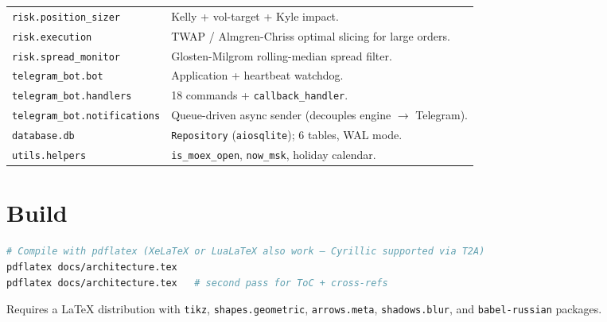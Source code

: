 \documentclass[11pt,a4paper]{article}
\begin{document}
\begin{center}
\begin{tabular}{@{}lp{11cm}@{}}
\texttt{risk.position\_sizer} & Kelly + vol-target + Kyle impact. \\
\texttt{risk.execution} & TWAP / Almgren-Chriss optimal slicing for large orders. \\
\texttt{risk.spread\_monitor} & Glosten-Milgrom rolling-median spread filter. \\
\texttt{telegram\_bot.bot} & Application + heartbeat watchdog. \\
\texttt{telegram\_bot.handlers} & 18 commands + \texttt{callback\_handler}. \\
\texttt{telegram\_bot.notifications} & Queue-driven async sender (decouples engine $\to$ Telegram). \\
\texttt{database.db} & \texttt{Repository} (\texttt{aiosqlite}); 6 tables, WAL mode. \\
\texttt{utils.helpers} & \texttt{is\_moex\_open}, \texttt{now\_msk}, holiday calendar. \\
\bottomrule
\end{tabular}
\end{center}

\section{Build}

\begin{lstlisting}[language=bash]
# Compile with pdflatex (XeLaTeX or LuaLaTeX also work — Cyrillic supported via T2A)
pdflatex docs/architecture.tex
pdflatex docs/architecture.tex   # second pass for ToC + cross-refs
\end{lstlisting}

Requires a LaTeX distribution with \texttt{tikz}, \texttt{shapes.geometric},
\texttt{arrows.meta}, \texttt{shadows.blur}, and \texttt{babel-russian}
packages.
\end{document}
